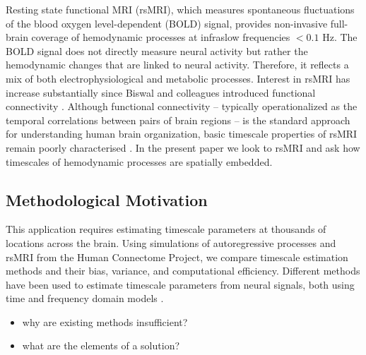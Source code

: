 \documentclass[latex/main.tex]{subfiles}
\begin{document}
Resting state functional MRI (rsMRI), which measures spontaneous fluctuations of the blood oxygen level-dependent (BOLD) signal, provides non-invasive full-brain coverage of hemodynamic processes at infraslow frequencies $<0.1$ Hz. The BOLD signal does not directly measure neural activity but rather the hemodynamic changes that are linked to neural activity. Therefore, it reflects a mix of both electrophysiological and metabolic processes. Interest in rsMRI has increase substantially since Biswal and colleagues introduced functional connectivity \cite{biswal_functional_1995}. Although functional connectivity -- typically operationalized as the temporal correlations between pairs of brain regions -- is the standard approach for understanding human brain organization, basic timescale properties of rsMRI remain poorly characterised \cite{shinn_functional_2023}. In the present paper we look to rsMRI and ask how timescales of hemodynamic processes are spatially embedded.\\

\subsection{Methodological Motivation}
This application requires estimating timescale parameters at thousands of locations across the brain. Using simulations of autoregressive processes and rsMRI from the Human Connectome Project, we compare timescale estimation methods and their bias, variance, and computational efficiency. Different methods have been used to estimate timescale parameters from neural signals, both using time and frequency domain models \cite{gao_neuronal_2020, raut_hierarchical_2020}. 

\begin{itemize}
    \item why are existing methods insufficient?
    \item what are the elements of a solution?
\end{itemize}
\end{document}
